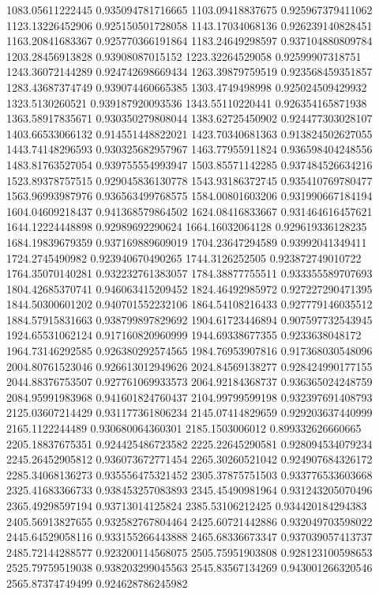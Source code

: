 {1083.05611222445 0.935094781716665
1103.09418837675 0.925967379411062
1123.13226452906 0.925150501728058
1143.17034068136 0.926239140828451
1163.20841683367 0.925770366191864
1183.24649298597 0.937104880809784
1203.28456913828 0.93908087015152
1223.32264529058 0.92599907318751
1243.36072144289 0.924742698669434
1263.39879759519 0.923568459351857
1283.43687374749 0.939074460665385
1303.4749498998 0.925024509429932
1323.5130260521 0.939187920093536
1343.55110220441 0.926354165871938
1363.58917835671 0.930350279808044
1383.62725450902 0.924477303028107
1403.66533066132 0.914551448822021
1423.70340681363 0.913824502627055
1443.74148296593 0.930325682957967
1463.77955911824 0.936598404248556
1483.81763527054 0.939755554993947
1503.85571142285 0.937484526634216
1523.89378757515 0.929045836130778
1543.93186372745 0.935410769780477
1563.96993987976 0.936563499768575
1584.00801603206 0.931990667184194
1604.04609218437 0.941368579864502
1624.08416833667 0.931464616457621
1644.12224448898 0.92989692290624
1664.16032064128 0.929619336128235
1684.19839679359 0.937169889609019
1704.23647294589 0.93992041349411
1724.2745490982 0.923940670490265
1744.3126252505 0.923872749010722
1764.35070140281 0.932232761383057
1784.38877755511 0.933355589707693
1804.42685370741 0.946063415209452
1824.46492985972 0.927227290471395
1844.50300601202 0.940701552232106
1864.54108216433 0.927779146035512
1884.57915831663 0.938799897829692
1904.61723446894 0.907597732543945
1924.65531062124 0.917160820960999
1944.69338677355 0.9233638048172
1964.73146292585 0.926380292574565
1984.76953907816 0.917368030548096
2004.80761523046 0.926613012949626
2024.84569138277 0.928424990177155
2044.88376753507 0.927761069933573
2064.92184368737 0.936365024248759
2084.95991983968 0.941601824760437
2104.99799599198 0.932397691408793
2125.03607214429 0.931177361806234
2145.07414829659 0.929203637440999
2165.1122244489 0.930680064360301
2185.1503006012 0.899332626660665
2205.18837675351 0.924425486723582
2225.22645290581 0.928094534079234
2245.26452905812 0.936073672771454
2265.30260521042 0.924907684326172
2285.34068136273 0.935556475321452
2305.37875751503 0.933776533603668
2325.41683366733 0.938453257083893
2345.45490981964 0.931243205070496
2365.49298597194 0.93713014125824
2385.53106212425 0.934420184294383
2405.56913827655 0.932582767804464
2425.60721442886 0.932049703598022
2445.64529058116 0.933155266443888
2465.68336673347 0.937039057413737
2485.72144288577 0.923200114568075
2505.75951903808 0.928123100598653
2525.79759519038 0.938203299045563
2545.83567134269 0.943001266320546
2565.87374749499 0.924628786245982
}
